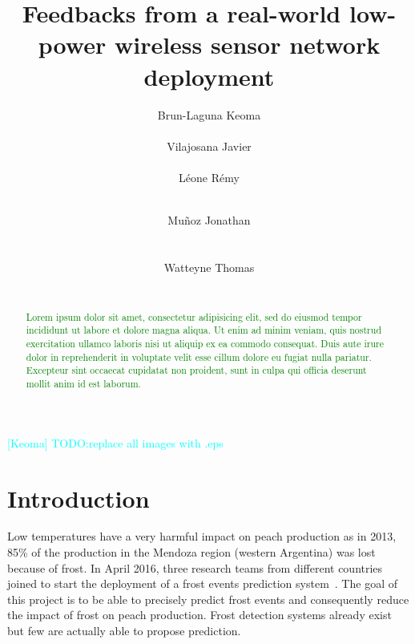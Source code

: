 \documentclass{sig-alternate}
\newcommand{\lorem}               {\textcolor{green}{Lorem ipsum dolor sit amet, consectetur adipisicing elit, sed do eiusmod tempor incididunt ut labore et dolore magna aliqua. Ut enim ad minim veniam, quis nostrud exercitation ullamco laboris nisi ut aliquip ex ea commodo consequat. Duis aute irure dolor in reprehenderit in voluptate velit esse cillum dolore eu fugiat nulla pariatur. Excepteur sint occaecat cupidatat non proident, sunt in culpa qui officia deserunt mollit anim id est laborum.}}
\newcommand{\keoma}[1]              {\textcolor{cyan}{[Keoma] #1}}
\begin{document}
\title{Feedbacks from a real-world low-power wireless sensor network deployment}

\author{
  \alignauthor Brun-Laguna Keoma\\
    \\
  \alignauthor Vilajosana Javier\\
    \\
  \alignauthor Léone Rémy \\
    \\
  \and
  \alignauthor Muñoz Jonathan\\
    \\
    \\
  \alignauthor Watteyne Thomas \\
    \\
}

\maketitle

\begin{abstract}
\lorem
\end{abstract}

\keoma{TODO:replace all images with .eps}

\section{Introduction}
\label{sec:intro}


Low temperatures have a very harmful impact on peach production as in 2013, 85\% of the production in the Mendoza region (western Argentina) was lost because of frost.
In April 2016, three research teams from different countries joined to start the deployment of a frost events prediction system~\cite{watteyne16peach}.
The goal of this project is to be able to precisely predict frost events and consequently reduce the impact of frost on peach production.
Frost detection systems already exist but few are actually able to propose prediction.
\end{document}
